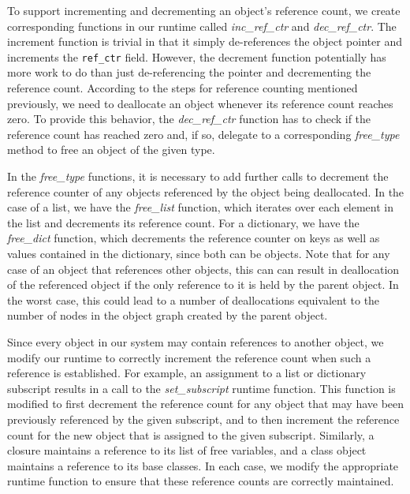 \documentclass{sigplanconf}
\newcommand{\afunction}[1]{\textit{#1}}
\newcommand{\afield}[1]{\texttt{#1}}
\begin{document}
To support incrementing and decrementing an object's reference count, we create corresponding functions in our runtime called \afunction{inc\_ref\_ctr} and \afunction{dec\_ref\_ctr}.  The increment function is trivial in that it simply de-references the object pointer and increments the \afield{ref\_ctr} field.   However, the decrement function potentially has more work to do than just de-referencing the pointer and decrementing the reference count.  According to the steps for reference counting mentioned previously, we need to deallocate an object whenever its reference count reaches zero.  To provide this behavior, the \afunction{dec\_ref\_ctr} function has to check if the reference count has reached zero and, if so, delegate to a corresponding \afunction{free\_\textit{type}} method to free an object of the given type.

In the \afunction{free\_\textit{type}} functions, it is necessary to add further calls to decrement the reference counter of any objects referenced by the object being deallocated.  In the case of a list, we have the \afunction{free\_list} function, which iterates over each element in the list and decrements its reference count.  For a dictionary, we have the \afunction{free\_dict} function, which decrements the reference counter on keys as well as values contained in the dictionary, since both can be objects.  Note that for any case of an object that references other objects, this can can result in deallocation of the referenced object if the only reference to it is held by the parent object.  In the worst case, this could lead to a number of deallocations equivalent to the number of nodes in the object graph created by the parent object.  

Since every object in our system may contain references to another object, we modify our runtime to correctly increment the reference count when such a reference is established.  For example, an assignment to a list or dictionary subscript results in a call to the \afunction{set\_subscript} runtime function.  This function is modified to first decrement the reference count for any object that may have been previously referenced by the given subscript, and to then increment the reference count for the new object that is assigned to the given subscript.  Similarly, a closure maintains a reference to its list of free variables, and a class object maintains a reference to its base classes.  In each case, we modify the appropriate runtime function to ensure that these reference counts are correctly maintained.  
\end{document}
